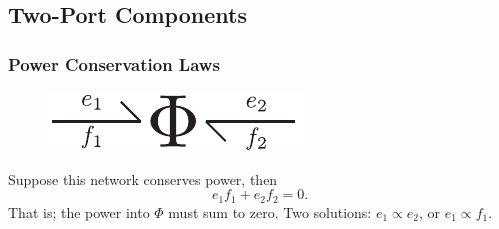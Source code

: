 \documentclass[11pt,reqno]{beamer}
\begin{document}
\subsection{Two-Port Components}
\begin{frame}
\frametitle{Power Conservation Laws}
\begin{figure}
	\includegraphics{images/twoport.pdf}
\end{figure}
Suppose this network conserves power, then
\[
e_1f_1 + e_2 f_2 = 0.
\]
That is; the power into $\Phi$ must sum to zero.
Two solutions: $e_1 \propto e_2$, or $e_1\propto f_1$.
\end{frame}
\end{document}
